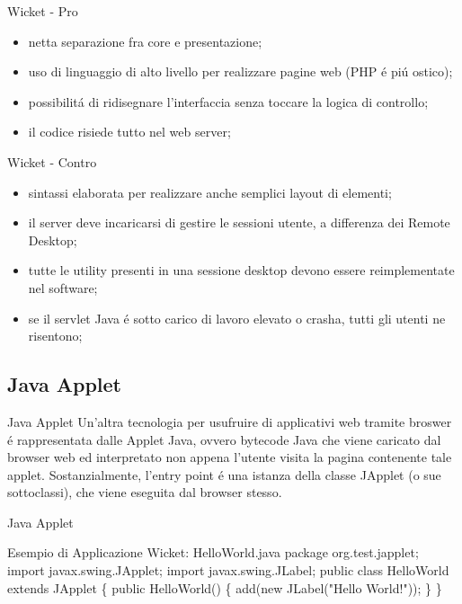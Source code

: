 \documentclass{beamer}
\begin{document}
\begin{frame}{Wicket - Pro}
\begin{itemize}
\item netta separazione fra core e presentazione;
\item uso di linguaggio di alto livello per realizzare pagine web (PHP \'e pi\'u ostico);
\item possibilit\'a di ridisegnare l'interfaccia senza toccare la logica di controllo;
\item il codice risiede tutto nel web server;
\end{itemize}
\end{frame}

\begin{frame}{Wicket - Contro}
\begin{itemize}
\item sintassi elaborata per realizzare anche semplici layout di elementi;
\item il server deve incaricarsi di gestire le sessioni utente, a differenza dei Remote Desktop;
\item tutte le utility presenti in una sessione desktop devono essere reimplementate nel software;
\item se il servlet Java \'e sotto carico di lavoro elevato o crasha, tutti gli utenti ne risentono;
\end{itemize}
\end{frame}

\subsection{Java Applet}
\begin{frame}{Java Applet}
Un'altra tecnologia per usufruire di applicativi web tramite broswer \'e rappresentata dalle Applet Java, ovvero bytecode Java
che viene caricato dal browser web ed interpretato non appena l'utente visita la pagina contenente tale applet.
\newline
Sostanzialmente, l'entry point \'e una istanza della classe JApplet (o sue sottoclassi), che viene eseguita dal browser stesso.
\end{frame}

\begin{frame}{Java Applet}
\begin{exampleblock}{Esempio di Applicazione Wicket: HelloWorld.java}
{\small
package org.test.japplet;
\newline
import javax.swing.JApplet;
\newline
import javax.swing.JLabel;
\newline
public class HelloWorld extends JApplet \{
\newline
\hspace*{5 mm}public HelloWorld() \{
\newline
\hspace*{10 mm} add(new JLabel("Hello World!"));
\newline
\hspace*{5 mm}\}
\newline
\}
\newline
}
\end{exampleblock}
\end{frame}
\end{document}
